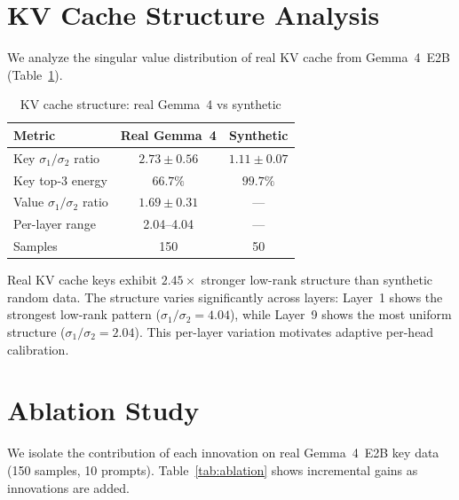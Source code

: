 \documentclass[10pt,twocolumn]{article}
\begin{document}
\section{KV Cache Structure Analysis}

We analyze the singular value distribution of real KV cache from Gemma~4~E2B (Table~\ref{tab:structure}).

\begin{table}[t]
\centering
\small
\caption{KV cache structure: real Gemma~4 vs synthetic}
\label{tab:structure}
\begin{tabular}{lcc}
\toprule
Metric & Real Gemma~4 & Synthetic \\
\midrule
Key $\sigma_1/\sigma_2$ ratio & $2.73 \pm 0.56$ & $1.11 \pm 0.07$ \\
Key top-3 energy & $66.7\%$ & $99.7\%$ \\
Value $\sigma_1/\sigma_2$ ratio & $1.69 \pm 0.31$ & --- \\
\midrule
Per-layer range & 2.04--4.04 & --- \\
Samples & 150 & 50 \\
\bottomrule
\end{tabular}
\end{table}

Real KV cache keys exhibit $2.45\times$ stronger low-rank structure than synthetic random data. The structure varies significantly across layers: Layer~1 shows the strongest low-rank pattern ($\sigma_1/\sigma_2 = 4.04$), while Layer~9 shows the most uniform structure ($\sigma_1/\sigma_2 = 2.04$). This per-layer variation motivates adaptive per-head calibration.

\section{Ablation Study}

We isolate the contribution of each innovation on real Gemma~4~E2B key data (150 samples, 10 prompts). Table~\ref{tab:ablation} shows incremental gains as innovations are added.
\end{document}
